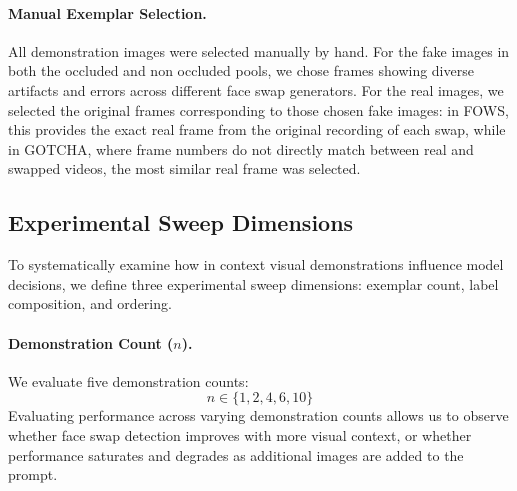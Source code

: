 \paragraph{Manual Exemplar Selection.}
All demonstration images were selected manually by hand. For the fake images in both the occluded and non occluded pools, we chose frames showing diverse artifacts and errors across different face swap generators. For the real images, we selected the original frames corresponding to those chosen fake images: in FOWS, this provides the exact real frame from the original recording of each swap, while in GOTCHA, where frame numbers do not directly match between real and swapped videos, the most similar real frame was selected.

\subsection{Experimental Sweep Dimensions}
\label{subsec:fewshot_dimensions}

To systematically examine how in context visual demonstrations influence model decisions, we define three experimental sweep dimensions: exemplar count, label composition, and ordering.

\paragraph{Demonstration Count ($n$).}
We evaluate five demonstration counts:
\begin{equation}
    n \in \{1, 2, 4, 6, 10\}
\end{equation}
Evaluating performance across varying demonstration counts allows us to observe whether face swap detection improves with more visual context, or whether performance saturates and degrades as additional images are added to the prompt.

